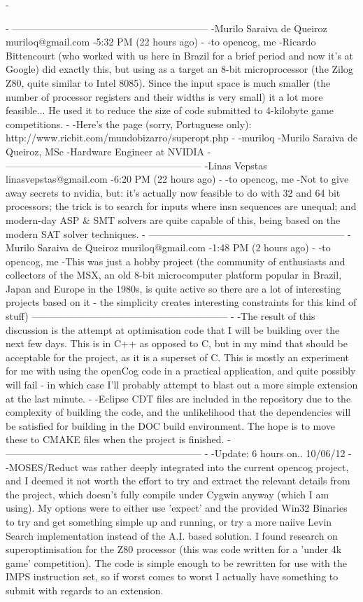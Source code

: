 -\documentclass[11pt]{article}
\begin{document}
-
------------------------------------------------------------
-Murilo Saraiva de Queiroz muriloq@gmail.com
-5:32 PM (22 hours ago)
-
-to opencog, me 
-Ricardo Bittencourt (who worked with us here in Brazil for a brief period and now it's at Google) did exactly this, but using as a target an 8-bit microprocessor (the Zilog Z80, quite similar to Intel 8085). Since the input space is much smaller (the number of processor registers and their widths is very small) it a lot more feasible... He used it to reduce the size of code submitted to 4-kilobyte game competitions. 
-
-Here's the page (sorry, Portuguese only):  http://www.ricbit.com/mundobizarro/superopt.php  
-
-muriloq
-Murilo Saraiva de Queiroz, MSc
-Hardware Engineer at NVIDIA
-
------------------------------------------------------------
-Linas Vepstas linasvepstas@gmail.com
-6:20 PM (22 hours ago)
-
-to opencog, me 
-Not to give away secrets to nvidia, but: it's actually now feasible to do with 32 and 64 bit processors; the trick is to search for inputs where insn sequences are unequal; and modern-day ASP & SMT solvers are quite capable of this, being based on the modern SAT solver techniques.
-
------------------------------------------------------------
-Murilo Saraiva de Queiroz muriloq@gmail.com
-1:48 PM (2 hours ago)
-
-to opencog, me 
-This was just a hobby project (the community of enthusiasts and collectors of the MSX, an old 8-bit microcomputer platform popular in Brazil, Japan and Europe in the 1980s, is quite active so there are a lot of interesting projects based on it - the simplicity creates interesting constraints for this kind of stuff)
------------------------------------------------------------
- 
-The result of this discussion is the attempt at optimisation code that I will be building over the next few days. This is in C++ as opposed to C, but in my mind that should be acceptable for the project, as it is a superset of C. This is mostly an experiment for me with using the openCog code in a practical application, and quite possibly will fail - in which case I'll probably attempt to blast out a more simple extension at the last minute.
-
-Eclipse CDT files are included in the repository due to the complexity of building the code, and the unlikelihood that the dependencies will be satisfied for building in the DOC build environment. The hope is to move these to CMAKE files when the project is finished.
-
------------------------------------------------------------
-
-Update: 6 hours on.. 10/06/12
-
-MOSES/Reduct was rather deeply integrated into the current opencog project, and I deemed it not worth the effort to try and extract the relevant details from the project, which doesn't fully compile under Cygwin anyway (which I am using). My options were to either use 'expect' and the provided Win32 Binaries to try and get something simple up and running, or try a more naiive Levin Search implementation instead of the A.I. based solution. I found research on superoptimisation for the Z80 processor (this was code written for a 'under 4k game' competition). The code is simple enough to be rewritten for use with the IMPS instruction set, so if worst comes to worst I actually have something to submit with regards to an extension.
\end{document}
